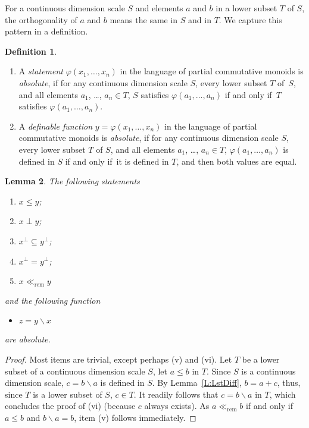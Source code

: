 \documentclass[psamsfonts,reqno]{memo-l}
\theoremstyle{plain}
\newtheorem{lemma}{Lemma}[section]
\theoremstyle{definition}
\newtheorem{definition}[lemma]{Definition}
\theoremstyle{remark}
\numberwithin{equation}{section}
\renewcommand{\iff}{if and only if}
\newcommand{\rem}{\ll_{\mathrm{rem}}}
\newcommand{\sd}{\smallsetminus}
\newcommand{\pcm}{partial commutative mon\-oid}
\begin{document}
For a continuous dimension scale $S$ and elements $a$ and
$b$ in a lower subset $T$ of $S$, the orthogonality of $a$ and $b$ means the
same in $S$ and in $T$. We capture this pattern in a definition.

\begin{definition}\label{D:Abs}\hfill
\begin{enumerate}
\item A \emph{statement} $\varphi(x_1,\dots,x_n)$ in the language of
\pcm s
is \emph{absolute},
if for any continuous dimension scale
$S$, every lower subset
$T$ of~$S$, and all elements $a_1$, \dots, $a_n\in T$, $S$ satisfies
$\varphi(a_1,\dots,a_n)$ \iff~$T$ satisfies $\varphi(a_1,\dots,a_n)$.

\item A \emph{definable function}
$y=\varphi(x_1,\dots,x_n)$ in the
language of \pcm s is \emph{absolute}, if
for any continuous dimension scale $S$, every lower subset
$T$ of $S$, and all elements $a_1$, \dots, $a_n\in T$,
$\varphi(a_1,\dots,a_n)$ is defined in $S$ \iff\ it is defined in $T$, and
then both values are equal.
\end{enumerate}
\end{definition}

\begin{lemma}\label{L:Abs}
The following statements
\begin{enumerate}
\item $x\leq y$;
\item $x\perp y$;
\item $x^\bot\subseteq y^\bot$;
\item $x^\bot=y^\bot$;
\item $x\rem y$
\end{enumerate}
and the following function
\begin{itemize}
\item[(vi)] $z=y\sd x$
\end{itemize}
are absolute.
\end{lemma}

\begin{proof}
Most items are trivial, except perhaps (v) and (vi). Let $T$ be a
lower subset of a continuous dimension scale $S$, let
$a\leq b$ in $T$. Since $S$ is a continuous dimension scale, $c=b\sd a$ is defined in $S$. By Lemma~\ref{L:LstDiff}, $b=a+c$,
thus, since $T$ is a lower subset of $S$,
$c\in T$. It readily follows that $c=b\sd a$ in $T$, which concludes the
proof of (vi) (because $c$ always exists). As $a\rem b$ \iff\ $a\leq b$ and
$b\sd a=b$, item (v) follows immediately.
\end{proof}
\end{document}
